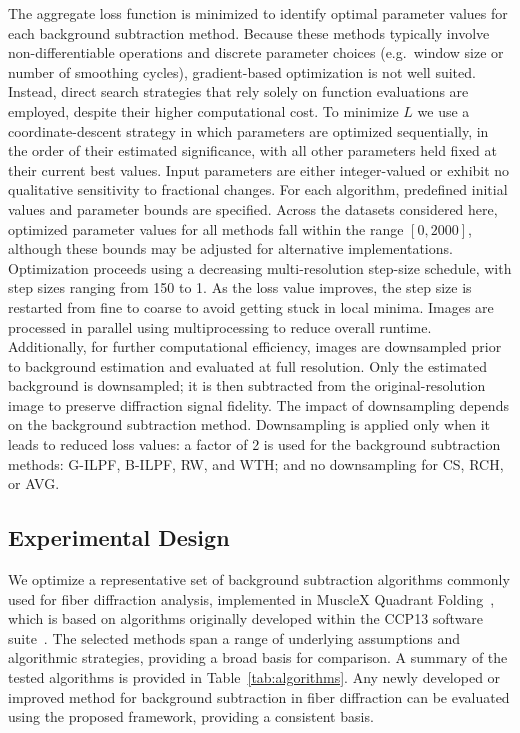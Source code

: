 \documentclass[iucr]{iucrjournals}
\begin{document}
The aggregate loss function is minimized to identify optimal parameter values for each background subtraction method. Because these methods typically involve non-differentiable operations and discrete parameter choices (e.g.\ window size or number of smoothing cycles), gradient-based optimization is not well suited. Instead, direct search strategies that rely solely on function evaluations are employed, despite their higher computational cost. To minimize $L$ we use a coordinate-descent strategy in which parameters are optimized sequentially, in the order of their estimated significance, with all other parameters held fixed at their current best values. Input parameters are either integer-valued or exhibit no qualitative sensitivity to fractional changes. For each algorithm, predefined initial values and parameter bounds are specified. Across the datasets considered here, optimized parameter values for all methods fall within the range $[0, 2000]$, although these bounds may be adjusted for alternative implementations. Optimization proceeds using a decreasing multi-resolution step-size schedule, with step sizes ranging from 150 to 1. As the loss value improves, the step size is restarted from fine to coarse to avoid getting stuck in local minima. Images are processed in parallel using multiprocessing to reduce overall runtime. Additionally, for further computational efficiency, images are downsampled prior to background estimation and evaluated at full resolution. Only the estimated background is downsampled; it is then subtracted from the original-resolution image to preserve diffraction signal fidelity. The impact of downsampling depends on the background subtraction method. Downsampling is applied only when it leads to reduced loss values: a factor of 2 is used for the background subtraction methods: G-ILPF, B-ILPF, RW, and WTH; and no downsampling for CS, RCH, or AVG.



\subsection{Experimental Design}
\label{sec:experimental_design}


We optimize a representative set of background subtraction algorithms commonly used for fiber diffraction analysis, implemented in MuscleX Quadrant Folding~\cite{JiratrakanvongEtAl2024}, which is based on algorithms originally developed within the CCP13 software suite~\cite{HeEtAl2007}. The selected methods span a range of underlying assumptions and algorithmic strategies, providing a broad basis for comparison. A summary of the tested algorithms is provided in Table~\ref{tab:algorithms}. Any newly developed or improved method for background subtraction in fiber diffraction can be evaluated using the proposed framework, providing a consistent basis.
\end{document}
